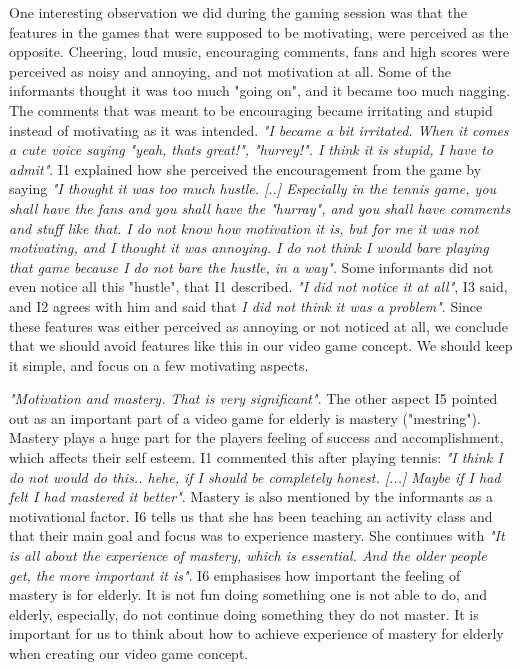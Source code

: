 One interesting observation we did during the gaming session was that the features in the games that were supposed to be motivating, were perceived as the opposite. Cheering, loud music, encouraging comments, fans and high scores were perceived as noisy and annoying, and not motivation at all. Some of the informants thought it was too much "going on", and it became too much nagging. The comments that was meant to be encouraging became irritating and stupid instead of motivating as it was intended. \emph{"I became a bit irritated. When it comes a cute voice saying "yeah, thats great!", "hurrey!". I think it is stupid, I have to admit"}.  I1 explained how she perceived the encouragement from the game by saying \emph{"I thought it was too much hustle. [..] Especially in the tennis game, you shall have the fans and you shall have the "hurray", and you shall have comments and stuff like that. I do not know how motivation it is, but for me it was not motivating, and I thought it was annoying. I do not think I would bare playing that game because I do not bare the hustle, in a way"}. Some informants did not even notice all this "hustle", that I1 described. \emph{"I did not notice it at all"}, I3 said, and I2 agrees with him and said that \emph{I did not think it was a problem"}. Since these features was either perceived as annoying or not noticed at all, we conclude that we should avoid features like this in our video game concept. We should keep it simple, and focus on a few motivating aspects. 

\emph{"Motivation and mastery. That is very significant"}. The other aspect I5 pointed out as an important part of a video game for elderly is mastery ("mestring"). Mastery plays a huge part for the players feeling of success and accomplishment, which affects their self esteem. I1 commented this after playing tennis: \emph{"I think I do not would do this.. hehe, if I should be completely honest. [...] Maybe if I had felt I had mastered it better"}. Mastery is also mentioned by the informants as a motivational factor. I6 tells us that she has been teaching an activity class and that their main goal and focus was to experience mastery. She continues with \emph{"It is all about the experience of mastery, which is essential. And the older people get, the more important it is"}. I6 emphasises how important the feeling of mastery is for elderly. It is not fun doing something one is not able to do, and elderly, especially, do not continue doing something they do not master. It is important for us to think about how to achieve experience of mastery for elderly when creating our video game concept. 

